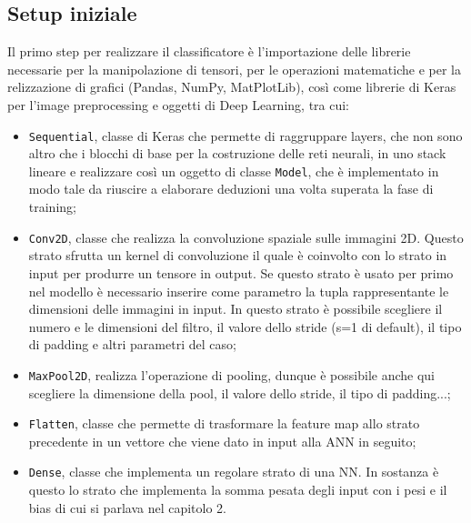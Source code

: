 \subsection{Setup iniziale}
Il primo step per realizzare il classificatore è l’importazione delle librerie necessarie per la manipolazione di tensori, per le operazioni matematiche e per la relizzazione di grafici (Pandas, NumPy, MatPlotLib), così come librerie di Keras per l’image preprocessing e oggetti di Deep Learning, tra cui:
\begin{itemize}
\item \lstinline{Sequential}, classe di Keras che permette di raggruppare layers, che non sono altro che i blocchi di base per la costruzione delle reti neurali, in uno stack lineare e realizzare così un oggetto di classe \lstinline{Model}, che è implementato in modo tale da riuscire a elaborare deduzioni una volta superata la fase di training; 
\item \lstinline{Conv2D}, classe che realizza la convoluzione spaziale sulle immagini 2D. Questo strato sfrutta un kernel di convoluzione il quale è coinvolto con lo strato in input per produrre un tensore in output. Se questo strato è usato per primo nel modello è necessario inserire come parametro la tupla rappresentante le dimensioni delle immagini in input. In questo strato è possibile scegliere il numero e le dimensioni del filtro, il valore dello stride (s=1 di default), il tipo di padding e altri parametri del caso; 
\item \lstinline{MaxPool2D}, realizza l’operazione di pooling, dunque è possibile anche qui scegliere la dimensione della pool, il valore dello stride, il tipo di padding...;
\item \lstinline{Flatten}, classe che permette di trasformare la feature map allo strato precedente in un vettore che viene dato in input alla ANN in seguito;
\item \lstinline{Dense}, classe che implementa un regolare strato di una NN.
 In sostanza è questo lo strato che implementa la somma pesata degli input con i pesi e il bias 
 di cui si parlava nel capitolo 2. 
\end{itemize}

